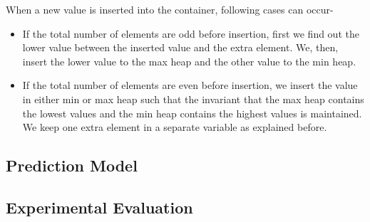 When a new value is inserted into the container, following cases can occur-
\begin{itemize}
\item If the total number of elements are odd before insertion, first we find out the lower value between the inserted value and the extra element. We, then, insert the lower value to the max heap and the other value to the min heap.
\item If the total number of elements are even before insertion, we insert the value in either min or max heap such that the invariant that the max heap contains the lowest values and the min heap contains the highest values is maintained. We keep one extra element in a separate variable as explained before.
\end{itemize}

\subsection{Prediction Model}

\subsection{Experimental Evaluation}
